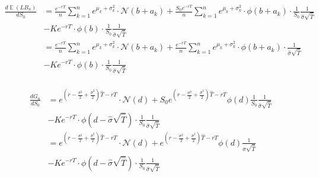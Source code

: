 \documentclass[10pt,oneside,a4paper]{article}
\DeclareMathOperator{\E}{\mathbb{E}}
\begin{document}
\begin{flushleft}
\begin{align*}
\frac{d \E\left(LB_n\right)}{dS_0} &= \frac{e^{-rT}}{n}\sum_{k=1}^{n} e^{\mu_k + \sigma_k^2} \cdot \mathcal{N}\left(b+a_k\right) + \frac{S_0 e^{-rT}}{n}\sum_{k=1}^{n}e^{\mu_k + \sigma_k^2} \cdot \phi\left(b+a_k\right) \cdot \frac{1}{S_0}\frac{1}{\hat{\sigma}\sqrt{\hat{T}}}\\
& - K e^{-rT} \cdot \phi\left(b \right) \cdot \frac{1}{S_0}\frac{1}{\hat{\sigma}\sqrt{\hat{T}}}\\
 &= \frac{e^{-rT}}{n}\sum_{k=1}^{n} e^{\mu_k + \sigma_k^2} \cdot \mathcal{N}\left(b+a_k\right) + \frac{e^{-rT}}{n}\sum_{k=1}^{n}e^{\mu_k + \sigma_k^2} \cdot \phi\left(b+a_k\right) \cdot \frac{1}{\hat{\sigma}\sqrt{\hat{T}}}\\
& - K e^{-rT} \cdot \phi\left(b \right) \cdot \frac{1}{S_0}\frac{1}{\hat{\sigma}\sqrt{\hat{T}}}\\
\end{align*} 

\vspace{5mm}
\begin{align*}
\frac{d G_n}{dS_0} &= e^{\left(r - \frac{\sigma^2}{2} + \frac{\hat{\sigma}^2}{2}\right)\hat{T} - rT} \cdot \mathcal{N}\left(d\right) + S_0 e^{\left(r - \frac{\sigma^2}{2} + \frac{\hat{\sigma}^2}{2}\right)\hat{T} - rT} \phi \left(d\right) \frac{1}{S_0} \frac{1}{\hat{\sigma}\sqrt{\hat{T}}}\\
& - K e^{-rT} \cdot \phi\left(d - \hat{\sigma}\sqrt{\hat{T}}\right) \cdot \frac{1}{S_0}\frac{1}{\hat{\sigma}\sqrt{\hat{T}}}\\
&= e^{\left(r - \frac{\sigma^2}{2} + \frac{\hat{\sigma}^2}{2}\right)\hat{T} - rT} \cdot \mathcal{N}\left(d\right) +e^{\left(r - \frac{\sigma^2}{2} + \frac{\hat{\sigma}^2}{2}\right)\hat{T} - rT} \phi \left(d\right) \frac{1}{\hat{\sigma}\sqrt{\hat{T}}}\\
& - K e^{-rT} \cdot \phi\left(d - \hat{\sigma}\sqrt{\hat{T}}\right) \cdot \frac{1}{S_0}\frac{1}{\hat{\sigma}\sqrt{\hat{T}}}\\
\end{align*}


\end{flushleft}
\end{document}

